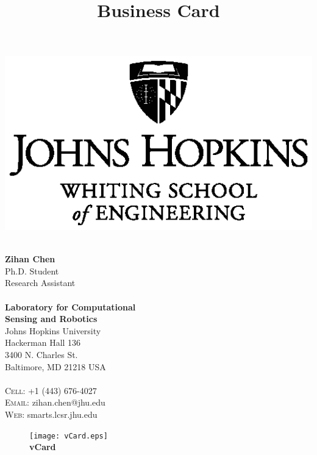 \documentclass[11pt,a4paper]{memoir}
\title{Business Card}
\makeatletter
\def\Who   {Zihan Chen}
\def\CityZip {Baltimore, MD 21218 USA}
\def\Email   {zihan.chen@jhu.edu}
\def\TEL     {+1 (443) 676-4027}
\def\WEB     {smarts.lcsr.jhu.edu}
\makeatother
\begin{document}

\begin{Spacing}{1.00}
\noindent
\tiny
\hspace{2.7mm}
\begin{minipage}{0.42\textwidth}
\begin{center}
\includegraphics[trim=37 10 35 10, clip, width=1.0\linewidth]{jhu_wse_logo}
\end{center}
\end{minipage}
%
\hspace{5.0mm}
%
\begin{minipage}{0.55\textwidth}
\hspace{0.1em} \\
\textbf{\Who} \\
Ph.D. Student \\ 
Research Assistant \\
\hspace{0.5em} \\
\textbf{Laboratory for Computational \\
Sensing and Robotics} \\
Johns Hopkins University \\
Hackerman Hall 136 \\
3400 N. Charles St. \\
\CityZip\\
\hspace{0.2em} \\
\textsc{Cell:} \hspace{0em} \TEL \\
\textsc{Email:} \Email \\
\textsc{Web:} \hspace{0.25em} \WEB \\
\end{minipage}

\vspace{1em}

\end{Spacing}

\newpage

\begin{figure}
\tiny
\centering
\texttt{[image: vCard.eps]}\\
\vspace{-2mm}
\textbf{vCard}
\end{figure}
\end{document}
